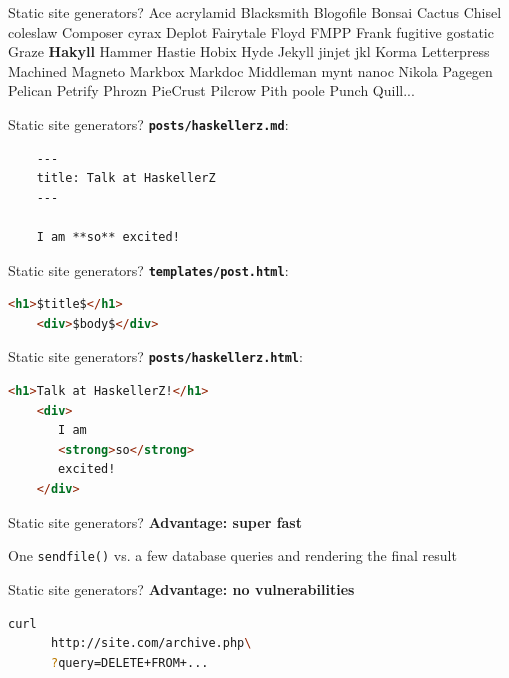 \documentclass[20pt]{beamer}
\newcommand{\vspaced}{
    \vspace{5mm}
}
\begin{document}
\begin{frame}{Static site generators?}
    \small{
    Ace acrylamid Blacksmith Blogofile Bonsai Cactus Chisel coleslaw
    Composer cyrax Deplot Fairytale Floyd FMPP Frank fugitive gostatic Graze
    \textbf{Hakyll} Hammer Hastie Hobix Hyde Jekyll jinjet jkl Korma Letterpress
    Machined Magneto Markbox Markdoc Middleman mynt nanoc Nikola Pagegen
    Pelican Petrify Phrozn PieCrust Pilcrow Pith poole Punch Quill...
    }
\end{frame}

\begin{frame}[fragile]{Static site generators?}
    \textbf{\texttt{posts/haskellerz.md}}:
    \vspaced
    \begin{lstlisting}
    ---
    title: Talk at HaskellerZ
    ---

    I am **so** excited!
    \end{lstlisting}
\end{frame}

\begin{frame}[fragile]{Static site generators?}
    \textbf{\texttt{templates/post.html}}:
    \vspaced
    \begin{lstlisting}[language=HTML]
    <h1>$title$</h1>
    <div>$body$</div>
    \end{lstlisting}
\end{frame}

\begin{frame}[fragile]{Static site generators?}
    \textbf{\texttt{posts/haskellerz.html}}:
    \vspaced
    \begin{lstlisting}[language=HTML]
    <h1>Talk at HaskellerZ!</h1>
    <div>
       I am
       <strong>so</strong>
       excited!
    </div>
    \end{lstlisting}
\end{frame}

\begin{frame}{Static site generators?}
    \textbf{Advantage: super fast} \\
    \vspaced
    One \texttt{sendfile()} vs. a few database queries and rendering the final
    result
\end{frame}

\begin{frame}[fragile]{Static site generators?}
    \textbf{Advantage: no vulnerabilities} \\
    \vspaced
    \begin{lstlisting}[language=bash]
    curl
      http://site.com/archive.php\
      ?query=DELETE+FROM+...
    \end{lstlisting}
\end{frame}
\end{document}
